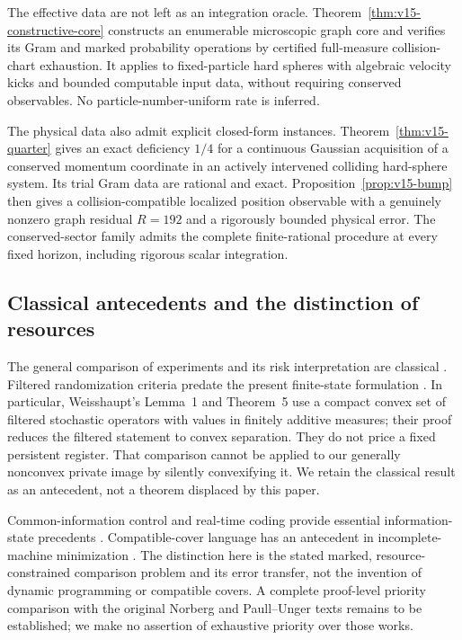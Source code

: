 The effective data are not left as an integration oracle.
Theorem~\ref{thm:v15-constructive-core} constructs an enumerable
microscopic graph core and verifies its Gram and marked probability
operations by certified full-measure collision-chart exhaustion. It
applies to fixed-particle hard spheres with algebraic velocity kicks
and bounded computable input data, without requiring conserved
observables. No particle-number-uniform rate is inferred.

The physical data also admit explicit closed-form instances.
Theorem~\ref{thm:v15-quarter} gives an exact deficiency $1/4$ for a
continuous Gaussian acquisition of a conserved momentum coordinate in
an actively intervened colliding hard-sphere system. Its trial Gram
data are rational and exact. Proposition~\ref{prop:v15-bump} then gives
a collision-compatible localized position observable with a genuinely
nonzero graph residual $R=192$ and a rigorously bounded physical error.
The conserved-sector family admits the complete finite-rational
procedure at every fixed horizon, including rigorous scalar integration.

\subsection{Classical antecedents and the distinction of resources}
The general comparison of experiments and its risk interpretation are
classical \cite{Blackwell1953,LeCam1964}. Filtered randomization criteria
predate the present finite-state formulation
\cite{Norberg2002,Weisshaupt2002}. In particular, Weisshaupt's Lemma~1
and Theorem~5 use a compact convex set of filtered stochastic operators
with values in finitely additive measures; their proof reduces the
filtered statement to convex separation. They do not price a fixed
persistent register. That comparison cannot be applied to our generally
nonconvex private image by silently convexifying it. We retain the
classical result as an antecedent, not a theorem displaced by this paper.

Common-information control and real-time coding provide essential
information-state precedents
\cite{NayyarMahajanTeneketzis2013,Witsenhausen1979}. Compatible-cover
language has an antecedent in incomplete-machine minimization
\cite{PaullUnger1959}. The distinction here is the stated marked,
resource-constrained comparison problem and its error transfer, not the
invention of dynamic programming or compatible covers. A complete
proof-level priority comparison with the original Norberg and
Paull--Unger texts remains to be established; we make no assertion of
exhaustive priority over those works.

